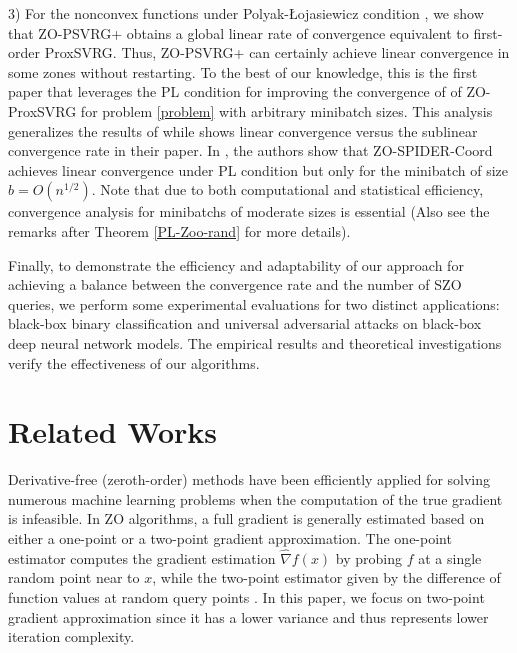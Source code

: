 3) For the nonconvex functions under Polyak-Łojasiewicz condition \cite{polyak1963gradient}, we show that ZO-PSVRG+
obtains a global linear rate of convergence  equivalent to first-order ProxSVRG. Thus, ZO-PSVRG+ can certainly achieve linear convergence in some zones without restarting. To the best of
our knowledge, this is the first paper that leverages the PL condition for improving the convergence of of ZO-ProxSVRG for problem \eqref{problem} with arbitrary minibatch sizes. This analysis generalizes the results of \cite{duchi2015optimal} while  shows linear convergence versus the sublinear convergence rate in their paper.
In \cite{ji2019improved}, the authors show that  ZO-SPIDER-Coord achieves linear convergence under PL condition but only for the minibatch of size $b = O(n^{1/2})$. Note that due to both computational and statistical efficiency, convergence analysis for minibatchs of moderate sizes is essential (Also see the remarks after Theorem \ref{PL-Zoo-rand} for more details). 

Finally, to demonstrate the efficiency and adaptability of our approach for achieving a balance between the convergence rate and the number of SZO queries, we perform some
experimental evaluations for two distinct applications: black-box binary classification and universal adversarial
attacks on black-box deep neural network models. The empirical results and
theoretical investigations verify the effectiveness of our algorithms.

\section{Related Works}
Derivative-free (zeroth-order) methods have been efficiently applied for solving numerous machine learning problems when the computation of the true gradient is infeasible. In ZO algorithms, a full gradient is generally estimated based on either a one-point or a two-point gradient approximation. The one-point estimator computes the gradient estimation $\hat{\nabla} f(x)$ by probing $f$ at a single random point near to $x$,   while the two-point estimator given by the difference of function values at random
query points \cite{agarwal2010optimal,nesterov2017random}. In this paper, we focus on two-point gradient approximation since it has a lower variance and thus represents lower iteration complexity.

